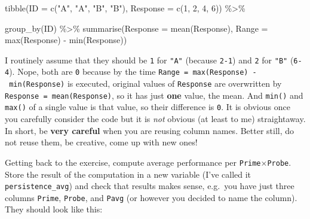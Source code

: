 \documentclass[
]{book}
\newenvironment{Shaded}{\begin{snugshade}}{\end{snugshade}}
\newcommand{\AttributeTok}[1]{\textcolor[rgb]{0.77,0.63,0.00}{#1}}
\newcommand{\DecValTok}[1]{\textcolor[rgb]{0.00,0.00,0.81}{#1}}
\newcommand{\FunctionTok}[1]{\textcolor[rgb]{0.00,0.00,0.00}{#1}}
\newcommand{\NormalTok}[1]{#1}
\newcommand{\SpecialCharTok}[1]{\textcolor[rgb]{0.00,0.00,0.00}{#1}}
\newcommand{\StringTok}[1]{\textcolor[rgb]{0.31,0.60,0.02}{#1}}
\begin{document}
\begin{Shaded}
\begin{Highlighting}[]
\FunctionTok{tibble}\NormalTok{(}\AttributeTok{ID =} \FunctionTok{c}\NormalTok{(}\StringTok{"A"}\NormalTok{, }\StringTok{"A"}\NormalTok{, }\StringTok{"B"}\NormalTok{, }\StringTok{"B"}\NormalTok{),}
       \AttributeTok{Response =} \FunctionTok{c}\NormalTok{(}\DecValTok{1}\NormalTok{, }\DecValTok{2}\NormalTok{, }\DecValTok{4}\NormalTok{, }\DecValTok{6}\NormalTok{)) }\SpecialCharTok{\%\textgreater{}\%}
  
  \FunctionTok{group\_by}\NormalTok{(ID) }\SpecialCharTok{\%\textgreater{}\%}
  \FunctionTok{summarise}\NormalTok{(}\AttributeTok{Response =} \FunctionTok{mean}\NormalTok{(Response),}
            \AttributeTok{Range =} \FunctionTok{max}\NormalTok{(Response) }\SpecialCharTok{{-}} \FunctionTok{min}\NormalTok{(Response))}
\end{Highlighting}
\end{Shaded}

I routinely assume that they should be \texttt{1} for \texttt{"A"} (because \texttt{2-1}) and \texttt{2} for \texttt{"B"} (\texttt{6-4}). Nope, both are \texttt{0} because by the time \texttt{Range\ =\ max(Response)\ -\ min(Response)} is executed, original values of \texttt{Response} are overwritten by \texttt{Response\ =\ mean(Response)}, so it has just \textbf{one} value, the mean. And \texttt{min()} and \texttt{max()} of a single value is that value, so their difference is \texttt{0}. It is obvious once you carefully consider the code but it is \emph{not} obvious (at least to me) straightaway. In short, be \textbf{very careful} when you are reusing column names. Better still, do not reuse them, be creative, come up with new ones!

Getting back to the exercise, compute average performance per \texttt{Prime}×\texttt{Probe}. Store the result of the computation in a new variable (I've called it \texttt{persistence\_avg}) and check that results makes sense, e.g.~you have just three columns \texttt{Prime}, \texttt{Probe}, and \texttt{Pavg} (or however you decided to name the column). They should look like this:
\end{document}
